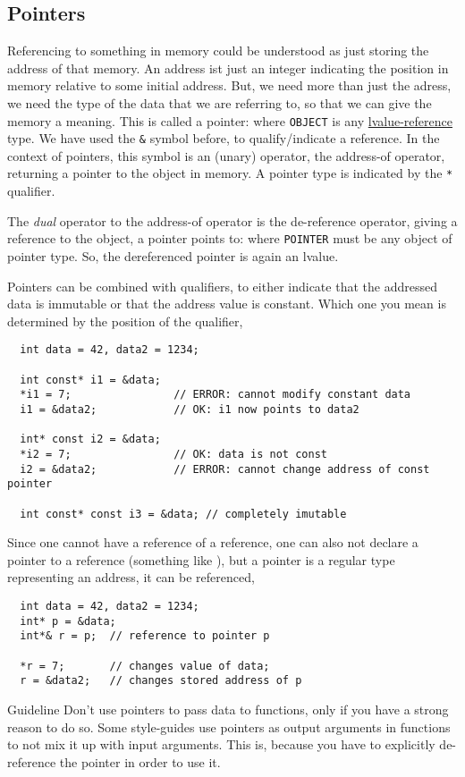 \subsection{Pointers}
Referencing to something in memory could be understood as just storing the address of that memory. An address ist just an integer indicating
the position in memory relative to some initial address. But, we need more than just the adress, we need the type of the data that we are
referring to, so that we can give the memory a meaning. This is called a pointer:
%
%
where \texttt{OBJECT} is any \underline{lvalue-reference} type.
We have used the \texttt{\&} symbol before, to qualify/indicate a reference. In the context of pointers, this symbol is an (unary) operator, the
address-of operator, returning a pointer to the object in memory. A pointer type is indicated by the \texttt{*} qualifier.

The \textit{dual} operator to the address-of operator is the de-reference operator, giving a reference to the object, a pointer points to:
%
%
where \texttt{POINTER} must be any object of pointer type. So, the dereferenced pointer is again an lvalue.

Pointers can be combined with  qualifiers, to either indicate that the addressed data is immutable or that the address value is constant.
Which one you mean is determined by the position of the  qualifier, \ie
%
\begin{verbatim}
  int data = 42, data2 = 1234;

  int const* i1 = &data;
  *i1 = 7;                // ERROR: cannot modify constant data
  i1 = &data2;            // OK: i1 now points to data2

  int* const i2 = &data;
  *i2 = 7;                // OK: data is not const
  i2 = &data2;            // ERROR: cannot change address of const pointer

  int const* const i3 = &data; // completely imutable
\end{verbatim}

Since one cannot have a reference of a reference, one can also not declare a pointer to a reference (something like ), but a
pointer is a regular type representing an address, it can be referenced, \ie
%
\begin{verbatim}
  int data = 42, data2 = 1234;
  int* p = &data;
  int*& r = p;  // reference to pointer p

  *r = 7;       // changes value of data;
  r = &data2;   // changes stored address of p
\end{verbatim}

\begin{guideline}{Guideline}
  Don't use pointers to pass data to functions, only if you have a strong reason to do so. Some style-guides use pointers as output arguments
  in functions to not mix it up with input arguments. This is, because you have to explicitly de-reference the pointer in order to use it.
\end{guideline}
